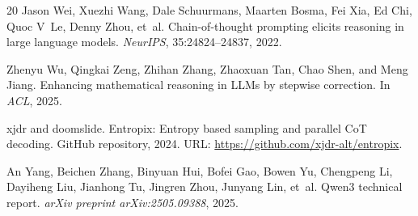\documentclass{article}
\begin{document}
\begin{thebibliography}{20}
Jason Wei, Xuezhi Wang, Dale Schuurmans, Maarten Bosma, Fei Xia, Ed Chi, Quoc V~Le, Denny Zhou, et~al.
\newblock Chain-of-thought prompting elicits reasoning in large language models.
\newblock \emph{NeurIPS}, 35:24824--24837, 2022.

Zhenyu Wu, Qingkai Zeng, Zhihan Zhang, Zhaoxuan Tan, Chao Shen, and Meng Jiang.
\newblock Enhancing mathematical reasoning in LLMs by stepwise correction.
\newblock In \emph{ACL}, 2025.

xjdr and doomslide.
\newblock Entropix: Entropy based sampling and parallel CoT decoding.
\newblock GitHub repository, 2024.
\newblock URL: \url{https://github.com/xjdr-alt/entropix}.

An Yang, Beichen Zhang, Binyuan Hui, Bofei Gao, Bowen Yu, Chengpeng Li, Dayiheng Liu, Jianhong Tu, Jingren Zhou, Junyang Lin, et~al.
\newblock Qwen3 technical report.
\newblock \emph{arXiv preprint arXiv:2505.09388}, 2025.

\end{thebibliography}
\end{document}
